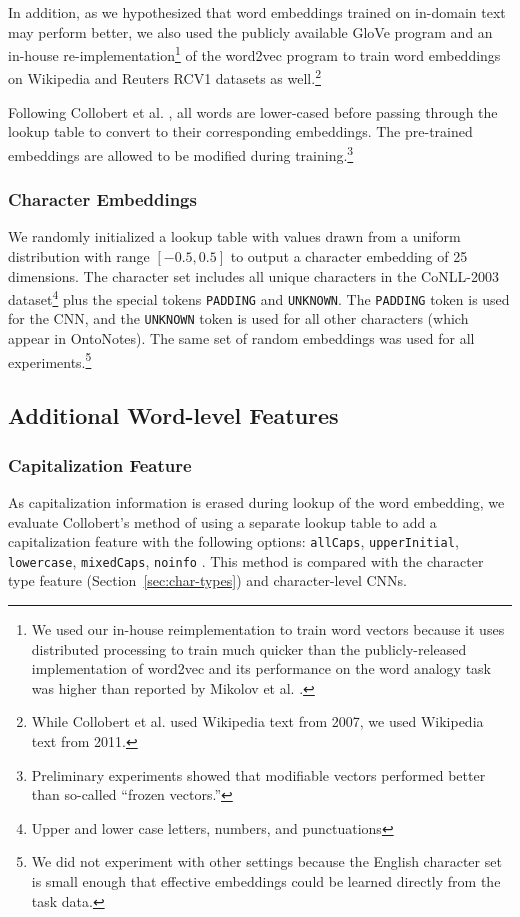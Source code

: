 \documentclass[11pt,letterpaper]{article}
\begin{document}
In addition, as we hypothesized that word embeddings trained on in-domain text may perform better, we also used the publicly available GloVe \cite{pennington2014} program and an in-house re-implementation\footnote{We used our in-house reimplementation to train word vectors because it uses distributed processing to train much quicker than the publicly-released implementation of word2vec and its performance on the word analogy task was higher than reported by Mikolov et al. .} of the word2vec \cite{mikolov2013} program to train word embeddings on Wikipedia and Reuters RCV1 datasets as well.\footnote{While Collobert et al.  used Wikipedia text from 2007, we used Wikipedia text from 2011.}

Following Collobert et al. , all words are lower-cased before passing through the lookup table to convert to their corresponding embeddings. The pre-trained embeddings are allowed to be modified during training.\footnote{Preliminary experiments showed that modifiable vectors performed better than so-called ``frozen vectors.''}

\subsubsection{Character Embeddings}
\label{sec:charvec}
We randomly initialized a lookup table with values drawn from a uniform distribution with range $[-0.5, 0.5]$ to output a character embedding of 25 dimensions. The character set includes all unique characters in the CoNLL-2003 dataset\footnote{Upper and lower case letters, numbers, and punctuations} plus the special tokens {\tt PADDING} and {\tt UNKNOWN}. The {\tt PADDING} token is used for the CNN, and the {\tt UNKNOWN} token is used for all other characters (which appear in OntoNotes). The same set of random embeddings was used for all experiments.\footnote{We did not experiment with other settings because the English character set is small enough that effective embeddings could be learned directly from the task data.}

\subsection{Additional Word-level Features}

\subsubsection{Capitalization Feature}
\label{sec:caps}
As capitalization information is erased during lookup of the word embedding, we evaluate Collobert's  method of using a separate lookup table to add a capitalization feature with the following options: {\tt allCaps}, {\tt upperInitial}, {\tt lowercase}, {\tt mixedCaps}, {\tt noinfo} \cite{collobert2011}. This method is compared with the character type feature (Section~\ref{sec:char-types}) and character-level CNNs.
\end{document}
